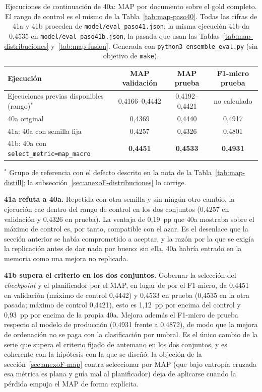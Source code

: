 \begin{table}[h]
\centering
\caption{Ejecuciones de continuación de 40a: MAP por documento sobre el gold completo. El rango de control es el mismo de la Tabla~\ref{tab:map-paso40}. Todas las cifras de 41a y 41b proceden de \texttt{model/\allowbreak eval\_paso41.json}; la misma ejecución 41b da 0,4535 en \texttt{model/\allowbreak eval\_paso41b.json}, la pasada que usan las Tablas~\ref{tab:map-distribuciones} y~\ref{tab:map-fusion}. Generada con \texttt{python3 ensemble\_eval.py} (sin objetivo de \texttt{make}).}
\label{tab:map-paso41}
\begin{tabular}{P{5.2cm}ccc}
\hline
\textbf{Ejecución} & \textbf{MAP validación} & \textbf{MAP prueba} & \textbf{F1-micro prueba} \\
\hline
Ejecuciones previas disponibles (rango)$^{*}$ & 0{,}4166--0{,}4442 & 0{,}4192--0{,}4421 & no calculado \\
40a original & 0{,}4369 & 0{,}4440 & 0{,}4917 \\
\hline
41a: 40a con semilla fija & 0{,}4257 & 0{,}4326 & 0{,}4801 \\
41b: 40a con \texttt{select\_metric=map\_macro} & \textbf{0{,}4451} & \textbf{0{,}4533} & \textbf{0{,}4931} \\
\hline
\end{tabular}

\vspace{2mm}
{\footnotesize $^{*}$ Grupo de referencia con el defecto descrito en la nota de la Tabla~\ref{tab:map-distill}; la subsección~\ref{sec:anexoF-distribuciones} lo corrige.}
\end{table}

\textbf{41a refuta a 40a.} Repetida con otra semilla y sin ningún otro cambio, la ejecución cae dentro del rango de control en los dos conjuntos (0,4257 en validación y 0,4326 en prueba). La ventaja de 0,19~pp que 40a mostraba sobre el máximo de control es, por tanto, compatible con el azar. Es el desenlace que la sección anterior se había comprometido a aceptar, y la razón por la que se exigía la replicación antes de dar nada por bueno: sin ella, 40a habría entrado en la memoria como una mejora no replicada.

\textbf{41b supera el criterio en los dos conjuntos.} Gobernar la selección del \emph{checkpoint} y el planificador por el MAP, en lugar de por el F1-micro, da 0,4451 en validación (máximo de control 0,4442) y 0,4533 en prueba (0,4535 en la otra pasada; máximo de control 0,4421), esto es 1,12~pp por encima del control y 0,93~pp por encima de la propia 40a. Mejora además el F1-micro de prueba respecto al modelo de producción (0,4931 frente a 0,4872), de modo que la mejora de ordenación no se paga con la clasificación por umbral. Es el único cambio de la serie que supera el criterio fijado de antemano en los dos conjuntos, y es coherente con la hipótesis con la que se diseñó: la objeción de la sección~\ref{sec:anexoF-map} contra seleccionar por MAP (que bajo entropía cruzada esa métrica es plana y guía mal al planificador) deja de aplicarse cuando la pérdida empuja el MAP de forma explícita.

